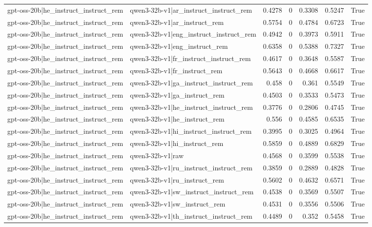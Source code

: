 \begin{table}
\begin{tabular}{l l r r r r l}
gpt-oss-20b|he_instruct_instruct_rem & qwen3-32b-v1|ar_instruct_instruct_rem & 0.4278 & 0 & 0.3308 & 0.5247 & True \\
gpt-oss-20b|he_instruct_instruct_rem & qwen3-32b-v1|ar_instruct_rem & 0.5754 & 0 & 0.4784 & 0.6723 & True \\
gpt-oss-20b|he_instruct_instruct_rem & qwen3-32b-v1|eng_instruct_instruct_rem & 0.4942 & 0 & 0.3973 & 0.5911 & True \\
gpt-oss-20b|he_instruct_instruct_rem & qwen3-32b-v1|eng_instruct_rem & 0.6358 & 0 & 0.5388 & 0.7327 & True \\
gpt-oss-20b|he_instruct_instruct_rem & qwen3-32b-v1|fr_instruct_instruct_rem & 0.4617 & 0 & 0.3648 & 0.5587 & True \\
gpt-oss-20b|he_instruct_instruct_rem & qwen3-32b-v1|fr_instruct_rem & 0.5643 & 0 & 0.4668 & 0.6617 & True \\
gpt-oss-20b|he_instruct_instruct_rem & qwen3-32b-v1|ga_instruct_instruct_rem & 0.458 & 0 & 0.361 & 0.5549 & True \\
gpt-oss-20b|he_instruct_instruct_rem & qwen3-32b-v1|ga_instruct_rem & 0.4503 & 0 & 0.3533 & 0.5473 & True \\
gpt-oss-20b|he_instruct_instruct_rem & qwen3-32b-v1|he_instruct_instruct_rem & 0.3776 & 0 & 0.2806 & 0.4745 & True \\
gpt-oss-20b|he_instruct_instruct_rem & qwen3-32b-v1|he_instruct_rem & 0.556 & 0 & 0.4585 & 0.6535 & True \\
gpt-oss-20b|he_instruct_instruct_rem & qwen3-32b-v1|hi_instruct_instruct_rem & 0.3995 & 0 & 0.3025 & 0.4964 & True \\
gpt-oss-20b|he_instruct_instruct_rem & qwen3-32b-v1|hi_instruct_rem & 0.5859 & 0 & 0.4889 & 0.6829 & True \\
gpt-oss-20b|he_instruct_instruct_rem & qwen3-32b-v1|raw & 0.4568 & 0 & 0.3599 & 0.5538 & True \\
gpt-oss-20b|he_instruct_instruct_rem & qwen3-32b-v1|ru_instruct_instruct_rem & 0.3859 & 0 & 0.2889 & 0.4828 & True \\
gpt-oss-20b|he_instruct_instruct_rem & qwen3-32b-v1|ru_instruct_rem & 0.5602 & 0 & 0.4632 & 0.6571 & True \\
gpt-oss-20b|he_instruct_instruct_rem & qwen3-32b-v1|sw_instruct_instruct_rem & 0.4538 & 0 & 0.3569 & 0.5507 & True \\
gpt-oss-20b|he_instruct_instruct_rem & qwen3-32b-v1|sw_instruct_rem & 0.4531 & 0 & 0.3556 & 0.5506 & True \\
gpt-oss-20b|he_instruct_instruct_rem & qwen3-32b-v1|th_instruct_instruct_rem & 0.4489 & 0 & 0.352 & 0.5458 & True \\

\end{tabular}
\end{table}

